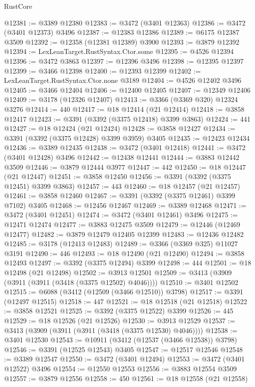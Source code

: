 \begin{lexlean}{RustCore}
\begin{coremodule}
@12381 := @3389 @12380
@12383 := @3472 (@3401 @12363)
@12386 := @3472 (@3401 @12373) @3496
@12387 := @12383 @12386
@12389 := @6175 @12387 @3509
@12392 := @12358 (@12381 @12389) @3900
@12393 := @3879 @12392
@12394 := LexLeanTarget.RustSyntax.Ctor.some
@12395 := @4526 @12394
@12396 := @3472 @3863
@12397 := @12396 @3496
@12398 := @12395 @12397
@12399 := @3466 @12398
@12400 := @12393 @12399
@12402 := LexLeanTarget.RustSyntax.Ctor.none @3189
@12404 := @4526 @12402 @3496
@12405 := @3466 @12404
@12406 := @12400 @12405
@12407 := @12349 @12406
@12409 := @3178 (@12326 @12407)
@12413 := @3366 (@3369 @320) @12324 @3276
@12414 := 440
@12417 := @18 @12414 (@21 @12414)
@12418 := @3858 @12417
@12423 := @3391 (@3392 (@3375 @12418) @3399 @3863)
@12424 := 441
@12427 := @18 @12424 (@21 @12424)
@12428 := @3858 @12427
@12434 := @3391 (@3392 (@3375 @12428) @3399 @3959) @3405
@12435 := @12423 @12434
@12436 := @3389 @12435
@12438 := @3472 (@3401 @12418)
@12441 := @3472 (@3401 @12428) @3496
@12442 := @12438 @12441
@12444 := @3883 @12442 @3509
@12446 := @3879 @12444 @3977
@12447 := 442
@12450 := @18 @12447 (@21 @12447)
@12451 := @3858 @12450
@12456 := @3391 (@3392 (@3375 @12451) @3399 @3863)
@12457 := 443
@12460 := @18 @12457 (@21 @12457)
@12461 := @3858 @12460
@12467 := @3391 (@3392 (@3375 @12461) @3399 @7102) @3405
@12468 := @12456 @12467
@12469 := @3389 @12468
@12471 := @3472 (@3401 @12451)
@12474 := @3472 (@3401 @12461) @3496
@12475 := @12471 @12474
@12477 := @3883 @12475 @3509
@12479 := @12446 (@12469 @12477)
@12482 := @3879 @12479 @12405 @12399
@12483 := @12436 @12482
@12485 := @3178 (@12413 @12483)
@12489 := @3366 (@3369 @325) @11027 @3191
@12490 := 446
@12493 := @18 @12490 (@21 @12490)
@12494 := @3858 @12493
@12497 := @3392 (@3375 @12494) @3399
@12498 := 444
@12501 := @18 @12498 (@21 @12498)
@12502 := @3913 @12501
@12509 := @3413 (@3909 (@3911 (@3911 (@3418 (@3375 @12502) @4046))))
@12510 := @3401 @12502
@12515 := @6088 (@3412 (@12509 (@3466 @12510)) @3798)
@12517 := @3391 (@12497 @12515)
@12518 := 447
@12521 := @18 @12518 (@21 @12518)
@12522 := @3858 @12521
@12525 := @3392 (@3375 @12522) @3399
@12526 := 445
@12529 := @18 @12526 (@21 @12526)
@12530 := @3913 @12529
@12537 := @3413 (@3909 (@3911 (@3911 (@3418 (@3375 @12530) @4046))))
@12538 := @3401 @12530
@12543 := @10911 (@3412 (@12537 (@3466 @12538)) @3798)
@12546 := @3391 (@12525 @12543) @3405
@12547 := @12517 @12546
@12548 := @3389 @12547
@12550 := @3472 (@3401 @12494)
@12553 := @3472 (@3401 @12522) @3496
@12554 := @12550 @12553
@12556 := @3883 @12554 @3509
@12557 := @3879 @12556
@12558 := 450
@12561 := @18 @12558 (@21 @12558)

\end{coremodule}
\end{lexlean}
